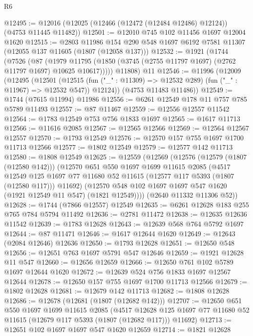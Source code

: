\begin{lexlean}{R6}
\begin{coremodule}
@12495 := @12016 (@12025 (@12466 (@12472 (@12484 @12486) @12124)) (@4753 @11445 @11482))
@12501 := @12010 @745 @102 @11456 @1697 @12004 @1620
@12515 := @2803
    @11986
    @154
    @290
    @548
    @1697
    @6192
    @7581
    @11307
    (@12055 @137 @11605 (@1807 (@12058 @137)))
@12532 := @1921
    (@1744
      (@7526
        (@87
          (@1979 @11795 (@1850 (@3745 (@2755 @11797 @1697) (@2762 @11797 @1697) @10625 @10617)))))
      @11808)
    @11
@12546 := @11996
    (@12009
      (@12495
        (@12501
          (@12515 (fun ("_" : @11309) => @12532 @289) (fun ("_" : @11967) => @12532 @547))
          @12124))
      (@4753 @11483 @11486))
@12549 := @1744 (@7615 @11994) @11986
@12556 := @6261 @12549 @178 @11 @757 @785 @5789 @11493
@12557 := @87 @11467
@12559 := @12556 @12557 @11542
@12564 := @1783 @12549 @753 @756 @1833 @1697
@12565 := @1617 @11713
@12566 := @11616 @2085
@12567 := @12565 @12566
@12569 := @12564 @12567 @12557
@12570 := @1793 @12549
@12576 := @12570 @157 @755 @1697 @1700 @11713 @12566
@12577 := @1802 @12549
@12579 := @12577 @142 @11713
@12580 := @1808 @12549
@12625 := @12559
    (@12569
      (@12576
        (@12579 (@1807 (@12580 @142)))
        (@12570
          @651
          @550
          @1697
          @1699
          @11615
          @2085
          (@4517
            @12549
            @125
            @1697
            @77
            @11680
            @52
            @11615
            (@12577 @117 @5393 (@1807 (@12580 @117)))
            @11692)
          (@12570 @548 @102 @1697 @1697 @547 @1620 (@1921 @12549 @11 @547) (@1821 @12549))))
      (@2640 @11332 @11306 @52))
@12628 := @1744 (@7866 @12557) @12549
@12635 := @6261 @12628 @183 @255 @765 @784 @5794 @11492
@12636 := @2781 @11472
@12638 := @12635 @12636 @11542
@12639 := @1783 @12628
@12643 := @12639 @568 @764 @5792 @1697
@12644 := @87 @11471
@12646 := @1617 @12644 @1620
@12649 := @12643 (@2084 @12646) @12636
@12650 := @1793 @12628
@12651 := @12650 @548
@12656 := @12651 @763 @1697 @5791 @547 @12646
@12659 := @1921 @12628 @11 @547
@12660 := @12656 @12659
@12666 := @12650 @761 @102 @5789 @1697 @12644 @1620
@12672 := @12639 @524 @756 @1833 @1697 @12567 @12644
@12678 := @12650 @157 @755 @1697 @1700 @11713 @12566
@12679 := @1802 @12628
@12681 := @12679 @142 @11713
@12682 := @1808 @12628
@12686 := @12678 (@12681 (@1807 (@12682 @142)))
@12707 := @12650
    @651
    @550
    @1697
    @1699
    @11615
    @2085
    (@4517 @12628 @125 @1697 @77 @11680 @52 @11615 (@12679 @117 @5393 (@1807 (@12682 @117))) @11692)
@12713 := @12651 @102 @1697 @1697 @547 @1620 @12659
@12714 := @1821 @12628

\end{coremodule}
\end{lexlean}
